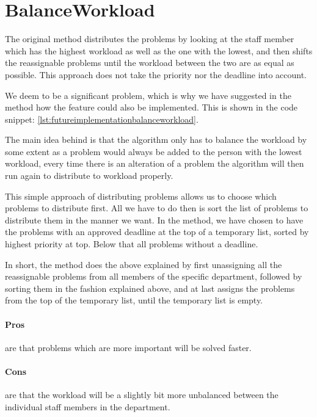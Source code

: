 \section{BalanceWorkload}
\label{sec:futureimplementationbalanceworkload}

The original  method distributes the problems by looking at the staff member which has the highest workload as well as the one with the lowest, and then shifts the reassignable problems until the workload between the two are as equal as possible. This approach does not take the priority nor the deadline into account.

We deem to be a significant problem, which is why we have suggested in the method  how  the feature could also be implemented. This is shown in the code snippet: \ref{lst:futureimplementationbalanceworkload}. 

The main idea behind  is that the algorithm only has to balance the workload by some extent as a problem would always be added to the person with the lowest workload, every time there is an alteration of a problem the algorithm will then run again to distribute to workload properly.

This simple approach of distributing problems allows us to choose which problems to distribute first. All we have to do then is sort the list of problems to distribute them in the manner we want. In the  method, we have chosen to have the problems with an approved deadline at the top of a temporary list, sorted by highest priority at top. Below that all problems without a deadline.

In short, the  method does the above explained by first unassigning all the reassignable problems from all members of the specific department, followed by sorting them in the fashion explained above, and at last assigns the problems from the top of the temporary list, until the temporary list is empty.

\paragraph{Pros} are that problems which are more important will be solved faster.
\paragraph{Cons} are that the workload will be a slightly bit more unbalanced between the individual staff members in the department.

